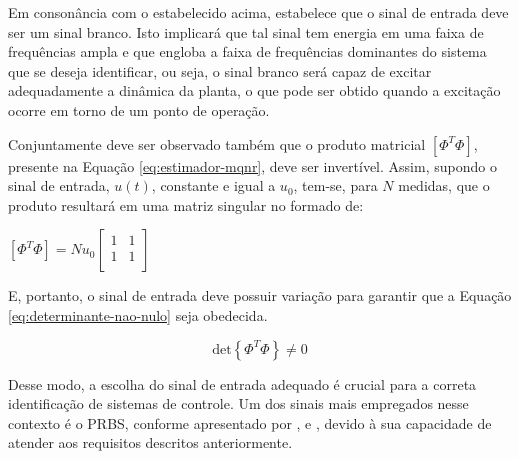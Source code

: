			Em consonância com o estabelecido acima,  estabelece que o sinal de entrada deve ser um sinal branco. Isto implicará que tal sinal tem energia em uma faixa de frequências ampla e que engloba a faixa de frequências dominantes do sistema que se deseja identificar, ou seja, o sinal branco será capaz de excitar adequadamente a dinâmica da planta, o que pode ser obtido quando a excitação ocorre em torno de um ponto de operação.

			Conjuntamente deve ser observado também que o produto matricial $[\Phi^T \Phi]$, presente na Equação \ref{eq:estimador-mqnr}, deve ser invertível. Assim, supondo o sinal de entrada, $u(t)$, constante e igual a $u_0$, tem-se, para $N$ medidas, que o produto resultará em uma matriz singular no formado de:

			\begin{center}
				$
				[\Phi^T \Phi] = N u_0 
				\begin{bmatrix}
					1 & 1 \\
					1 & 1 \\	
				\end{bmatrix}
				$
			\end{center}

			E, portanto, o sinal de entrada deve possuir variação para garantir que a Equação \ref{eq:determinante-nao-nulo} seja obedecida.

			\begin{equation}
				\label{eq:determinante-nao-nulo}
				\text{det} \left\{ \Phi^T \Phi \right\} \neq 0
			\end{equation}

			Desse modo, a escolha do sinal de entrada adequado é crucial para a correta identificação de sistemas de controle. Um dos sinais mais empregados nesse contexto é o \gls{PRBS}, conforme apresentado por ,  e , devido à sua capacidade de atender aos requisitos descritos anteriormente.



